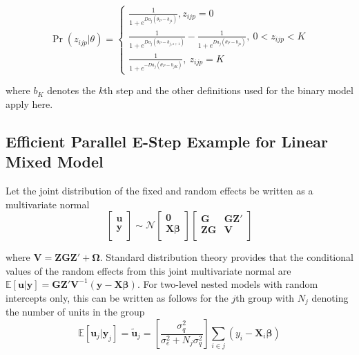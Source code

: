 \documentclass[12pt]{article}
\begin{document}
\begin{equation}
\Pr(z_{ijp}|\theta)=\left\{  \begin{array}{c}
\frac{1}{1+e^{Da_j(\theta_P-b_{j1})}},z_{ijp}=0 \\
\frac{1}{1+e^{Da_j(\theta_P-b_{j,z+1})}} - \frac{1}{1+e^{Da_j(\theta_P-b_{jz})}}, \ 0 < z_{ijp} < K \\
\frac{1}{1+e^{-Da_j(\theta_P-b_{jK})}},\ z_{ijp}=K 
 \end{array} \right. 
\end{equation} 
 
\noindent where $b_K$ denotes the $k$th step and the other definitions used for the binary model apply here.

\subsection*{Efficient Parallel E-Step Example for Linear Mixed Model}

Let the joint distribution of the fixed and random effects be written as a multivariate normal
\begin{equation}
\left [ 
\begin{array}{cc}
\bm{u} \\
\bm{y} \\
\end{array}
\right ]
\sim \mathcal{N}
\left [ 
\begin{array}{cc}
\bm{0} \\
\bm{X\beta} \\
\end{array}
\right ]
\left [ 
\begin{array}{cccc}
\bm{G} & \bm{GZ'} \\
\bm{ZG} & \bm{V} \\
\end{array}
\right ]
\end{equation}

\noindent where $\bm{V} = \bm{ZGZ'} + \bm{\Omega}$. Standard distribution theory provides that the conditional values of the random effects from this joint multivariate normal are $\mathbb{E}[\bm{u}|\bm{y}]  = \bm{GZ'V}^{-1}(\bm{y}-\bm{X\beta})$. For two-level nested models with random intercepts only, this can be written as follows for the $j$th group with $N_j$ denoting the number of units in the group
\begin{equation}
\label{eqn:eb}
\mathbb{E}[\bm{u}_j|\bm{y}_j] = \bm{\widetilde{u}}_j = \left[\frac{\sigma_{q}^2}{\sigma_{e}^2 + N_{j}\sigma_{q}^2}\right] \sum_{i \in j} \left(y_{i} - \bm{X}_i\bm{\beta}\right)
\end{equation}
\end{document}
